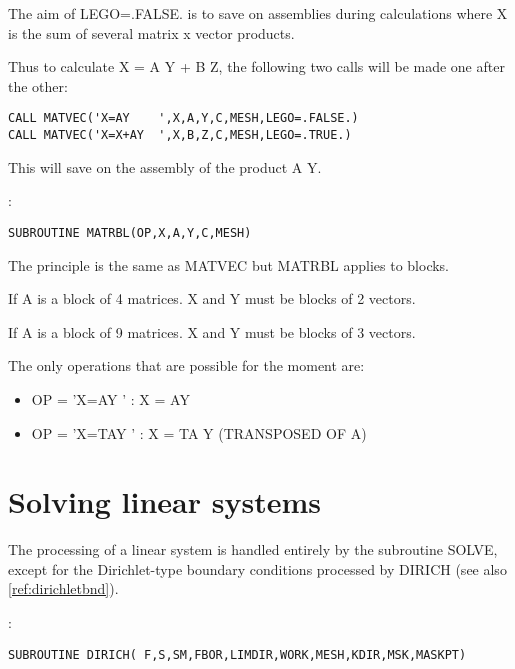 The aim of LEGO=.FALSE. is to save on assemblies during calculations where X is
the sum of several matrix x vector products.

Thus to calculate X = A Y + B Z, the following two calls will be made one after
the other:

\begin{lstlisting}[language=TelFortran]
CALL MATVEC('X=AY    ',X,A,Y,C,MESH,LEGO=.FALSE.)
CALL MATVEC('X=X+AY  ',X,B,Z,C,MESH,LEGO=.TRUE.)
\end{lstlisting}

This will save on the assembly of the product A Y.

:
\begin{lstlisting}[language=TelFortran]
SUBROUTINE MATRBL(OP,X,A,Y,C,MESH)
\end{lstlisting}

The principle is the same as MATVEC but MATRBL applies to blocks.

If A is a block of 4 matrices. X and Y must be blocks of 2 vectors.

If A is a block of 9 matrices. X and Y must be blocks of 3 vectors.

The only operations that are possible for the moment are:
\begin{itemize}
  \item OP = 'X=AY    '  : X = AY
  \item OP = 'X=TAY   '  : X = TA Y (TRANSPOSED OF A)
\end{itemize}

\section{Solving linear systems}

The processing of a linear system is handled entirely by the subroutine SOLVE,
except for the Dirichlet-type boundary conditions processed by DIRICH (see also
\ref{ref:dirichletbnd}).

:
\begin{lstlisting}[language=TelFortran]
SUBROUTINE DIRICH( F,S,SM,FBOR,LIMDIR,WORK,MESH,KDIR,MSK,MASKPT)
\end{lstlisting}

